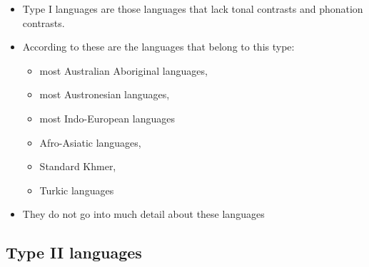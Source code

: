 \begin{itemize}
    \item Type I languages are those languages that lack tonal contrasts and phonation contrasts. 
    \item According to \citet{espositoCrosslinguisticPatternsPhonation2020} these are the languages that belong to this type:
    \begin{itemize}
        \item most Australian Aboriginal languages, 
        \item most Austronesian languages, 
        \item most Indo-European languages
        \item Afro-Asiatic languages, 
        \item Standard Khmer,
        \item Turkic languages
    \end{itemize}
    \item They do not go into much detail about these languages 
\end{itemize}

\subsection{Type II languages} \label{sec:TypeII}

